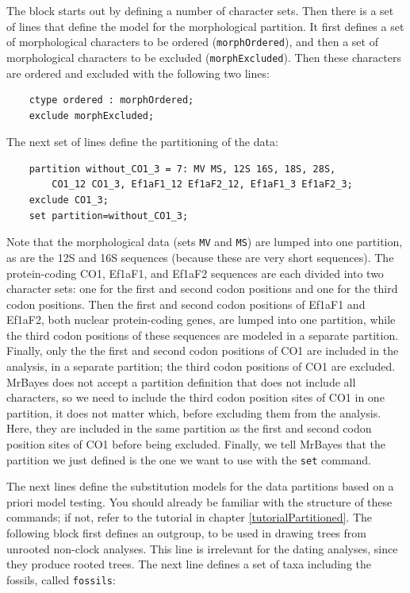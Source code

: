 \documentclass[12pt]{book}
\newcommand{\ttt}[1]{\texttt{#1}}
\begin{document}
The block starts out by defining a number of character sets. Then there is a set of lines that
define the model for the morphological partition. It first defines a set of morphological
characters to be ordered (\ttt{morphOrdered}), and then a set of morphological characters to be
excluded (\ttt{morphExcluded}). Then these characters are ordered and excluded with the following
two lines:

\small
\begin{singlespacing}
\begin{verbatim}
    ctype ordered : morphOrdered;
    exclude morphExcluded;
\end{verbatim}
\end{singlespacing}
\normalsize

The next set of lines define the partitioning of the data:

\small
\begin{singlespacing}
\begin{verbatim}
    partition without_CO1_3 = 7: MV MS, 12S 16S, 18S, 28S,
        CO1_12 CO1_3, Ef1aF1_12 Ef1aF2_12, Ef1aF1_3 Ef1aF2_3;
    exclude CO1_3;
    set partition=without_CO1_3;
\end{verbatim}
\end{singlespacing}
\normalsize

Note that the morphological data (sets \ttt{MV} and \ttt{MS}) are lumped into one partition, as are
the 12S and 16S sequences (because these are very short sequences). The protein-coding CO1, Ef1aF1,
and Ef1aF2 sequences are each divided into two character sets: one for the first and second codon
positions and one for the third codon positions. Then the first and second codon positions of
Ef1aF1 and Ef1aF2, both nuclear protein-coding genes, are lumped into one partition, while the
third codon positions of these sequences are modeled in a separate partition. Finally, only the the
first and second codon positions of CO1 are included in the analysis, in a separate partition; the
third codon positions of CO1 are excluded. MrBayes does not accept a partition definition that does
not include all characters, so we need to include the third codon position sites of CO1 in one
partition, it does not matter which, before excluding them from the analysis. Here, they are
included in the same partition as the first and second codon position sites of CO1 before being
excluded. Finally, we tell MrBayes that the partition we just defined is the one we want to use
with the \ttt{set} command.

The next lines define the substitution models for the data partitions based on a priori model
testing. You should already be familiar with the structure of these commands; if not, refer to the
tutorial in chapter \ref{tutorialPartitioned}. The following block first defines an outgroup, to be
used in drawing trees from unrooted non-clock analyses. This line is irrelevant for the dating
analyses, since they produce rooted trees. The next line defines a set of taxa including the
fossils, called \ttt{fossils}:
\end{document}
